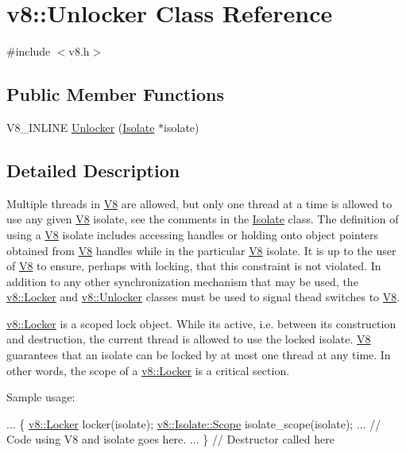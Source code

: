 \hypertarget{classv8_1_1Unlocker}{}\section{v8\+:\+:Unlocker Class Reference}
\label{classv8_1_1Unlocker}


{\ttfamily \#include $<$v8.\+h$>$}

\subsection*{Public Member Functions}
\begin{DoxyCompactItemize}
\item 
V8\+\_\+\+I\+N\+L\+I\+NE \hyperlink{classv8_1_1Unlocker_a2faeb117d7308b65ac85fdad390e4c1f}{Unlocker} (\hyperlink{classv8_1_1Isolate}{Isolate} $\ast$isolate)
\end{DoxyCompactItemize}


\subsection{Detailed Description}
Multiple threads in \hyperlink{classv8_1_1V8}{V8} are allowed, but only one thread at a time is allowed to use any given \hyperlink{classv8_1_1V8}{V8} isolate, see the comments in the \hyperlink{classv8_1_1Isolate}{Isolate} class. The definition of \textquotesingle{}using a \hyperlink{classv8_1_1V8}{V8} isolate\textquotesingle{} includes accessing handles or holding onto object pointers obtained from \hyperlink{classv8_1_1V8}{V8} handles while in the particular \hyperlink{classv8_1_1V8}{V8} isolate. It is up to the user of \hyperlink{classv8_1_1V8}{V8} to ensure, perhaps with locking, that this constraint is not violated. In addition to any other synchronization mechanism that may be used, the \hyperlink{classv8_1_1Locker}{v8\+::\+Locker} and \hyperlink{classv8_1_1Unlocker}{v8\+::\+Unlocker} classes must be used to signal thead switches to \hyperlink{classv8_1_1V8}{V8}.

\hyperlink{classv8_1_1Locker}{v8\+::\+Locker} is a scoped lock object. While it\textquotesingle{}s active, i.\+e. between its construction and destruction, the current thread is allowed to use the locked isolate. \hyperlink{classv8_1_1V8}{V8} guarantees that an isolate can be locked by at most one thread at any time. In other words, the scope of a \hyperlink{classv8_1_1Locker}{v8\+::\+Locker} is a critical section.

Sample usage\+: 
\begin{DoxyCode}
...
\{
  \hyperlink{classv8_1_1Locker}{v8::Locker} locker(isolate);
  \hyperlink{classv8_1_1Isolate_1_1Scope}{v8::Isolate::Scope} isolate\_scope(isolate);
  ...
  \textcolor{comment}{// Code using V8 and isolate goes here.}
  ...
\} \textcolor{comment}{// Destructor called here}
\end{DoxyCode}


